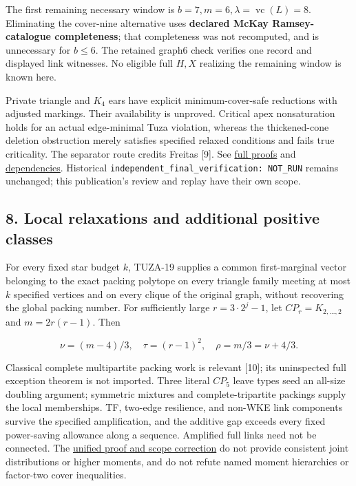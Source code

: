 \documentclass[11pt,a4paper]{article}
\begin{document}
The first remaining necessary window is \(b=7,m=6,\lambda=\operatorname{vc}(L)=8\). Eliminating the cover-nine alternative uses \textbf{declared McKay Ramsey-catalogue completeness}; that completeness was not recomputed, and is unnecessary for \(b\le6\). The retained graph6 check verifies one record and displayed link witnesses. No eligible full \(H,X\) realizing the remaining window is known here.

Private triangle and \(K_4\) ears have explicit minimum-cover-safe reductions with adjusted markings. Their availability is unproved. Critical apex nonsaturation holds for an actual edge-minimal Tuza violation, whereas the thickened-cone deletion obstruction merely satisfies specified relaxed conditions and fails true criticality. The separator route credits Freitas {[}9{]}. See \href{https://github.com/pappa211/ai-math-experiments/blob/main/problems/TUZA-17/PROOFS_AND_OBSTRUCTIONS.md}{full proofs} and \href{https://github.com/pappa211/ai-math-experiments/blob/main/problems/TUZA-17/PRIOR_ART_AND_DEPENDENCIES.md}{dependencies}. Historical \texttt{independent\_final\_verification:\ NOT\_RUN} remains unchanged; this publication's review and replay have their own scope.

\subsection{8. Local relaxations and additional positive classes}\label{local-relaxations-and-additional-positive-classes}

For every fixed star budget \(k\), TUZA-19 supplies a common first-marginal vector belonging to the exact packing polytope on every triangle family meeting at most \(k\) specified vertices and on every clique of the original graph, without recovering the global packing number. For sufficiently large \(r=3\cdot2^j-1\), let \(CP_r=K_{2,\ldots,2}\) and \(m=2r(r-1)\). Then

\[\nu=(m-4)/3,\quad\tau=(r-1)^2,\quad\rho=m/3=\nu+4/3.\]

Classical complete multipartite packing work is relevant {[}10{]}; its uninspected full exception theorem is not imported. Three literal \(CP_5\) leave types seed an all-size doubling argument; symmetric mixtures and complete-tripartite packings supply the local memberships. TF, two-edge resilience, and non-WKE link components survive the specified amplification, and the additive gap exceeds every fixed power-saving allowance along a sequence. Amplified full links need not be connected. The \href{https://github.com/pappa211/ai-math-experiments/blob/main/problems/TUZA-19/notes/global_routes_bounded_stars_all_cliques.md}{unified proof and scope correction} do not provide consistent joint distributions or higher moments, and do not refute named moment hierarchies or factor-two cover inequalities.
\end{document}
